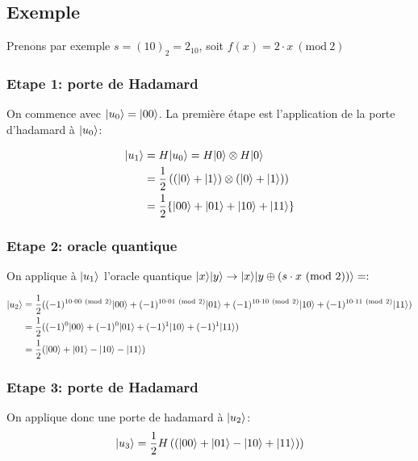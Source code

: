 \documentclass[12pt,a4paper]{article}
\DeclarePairedDelimiter\ket{\lvert}{\rangle}
\newcommand{\Mod}[1]{\ (\mathrm{mod}\ #1)}
\begin{document}
\subsection{Exemple}

Prenons par exemple $s=(10)_2 = 2_{10}$, soit $f(x) = 2 \cdot x \Mod{2}$
\subsubsection*{Etape 1: porte de Hadamard}

On commence avec $\ket{u_0} = \ket{00}$. La première étape est
l'application de la porte d'hadamard à $\ket{u_0}$:

\begin{align}
\ket{u_1} &= H\ket{u_0} = H\ket{0} \otimes H\ket{0} \\
& = \frac{1}{2} \left( (\ket{0} + \ket{1})\otimes(\ket{0} + \ket{1}) \right) \\
 & = \frac{1}{2}\{\ket{00} + \ket{01} + \ket{10} + \ket{11}\}
\end{align}


\subsubsection*{Etape 2: oracle quantique}

On applique à $\ket{u_1}$ l'oracle quantique $\ket{x}\ket{y}\rightarrow\ket{x}\ket{y\oplus (s \cdot x \Mod{2})} = :$

\begin{align*}
  \ket{u_2} &= \frac{1}{2}((-1)^{10 \cdot 00 \Mod{2}} \ket{00} + (-1)^{10 \cdot 01 \Mod{2}} \ket{01} + (-1)^{10 \cdot 10 \Mod{2}} \ket{10} + (-1)^{10 \cdot 11 \Mod{2}} \ket{11}) \\
  &= \frac{1}{2}((-1)^{0} \ket{00} + (-1)^{0} \ket{01} + (-1)^{1} \ket{10} + (-1)^{1} \ket{11}) \\
  &= \frac{1}{2} (\ket{00} + \ket{01} - \ket{10} - \ket{11})
\end{align*}

\subsubsection*{Etape 3: porte de Hadamard}

On applique donc une porte de hadamard à $\ket{u_2}$:
\begin{equation}
  \label{eq:5}
\ket{u_3} = \frac{1}{2} H \left( (\ket{00} + \ket{01} - \ket{10} + \ket{11}) \right) 
\end{equation}
\end{document}
